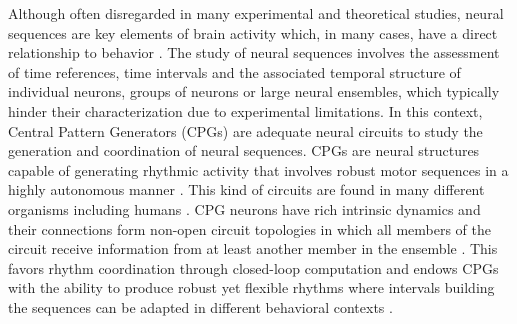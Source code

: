 Although often disregarded in many experimental and theoretical studies, neural sequences are key elements of brain activity which, in many cases, have a direct relationship to behavior \cite{Hahnloser2002,Venaille2005,HB10,Buzsaki2018,Rabinovich18,Paton2018,Elices2019}.
The study of neural sequences involves the assessment of time references, time intervals and the associated temporal structure of individual neurons, groups of neurons or large neural ensembles, which typically hinder their characterization due to experimental limitations. In this context, Central Pattern Generators (CPGs) are adequate neural circuits to study the generation and coordination of neural sequences. 
CPGs are neural structures capable of generating rhythmic activity that involves robust motor sequences in a highly autonomous manner \cite{Hartline76,Selverston2000,Marder01}. This kind of circuits are found in many different organisms including humans \cite{Dimitrijevic1998,Pavlidis2016, Arichi2017}. CPG neurons have rich intrinsic dynamics and their connections form non-open circuit topologies in which all members of the circuit receive information from at least another member in the ensemble \cite{Selverston2000,huertabc}. This favors rhythm coordination through closed-loop computation and endows CPGs with the ability to produce robust yet flexible rhythms where intervals building the sequences can be adapted in different behavioral contexts \cite{Elices2019}. %

